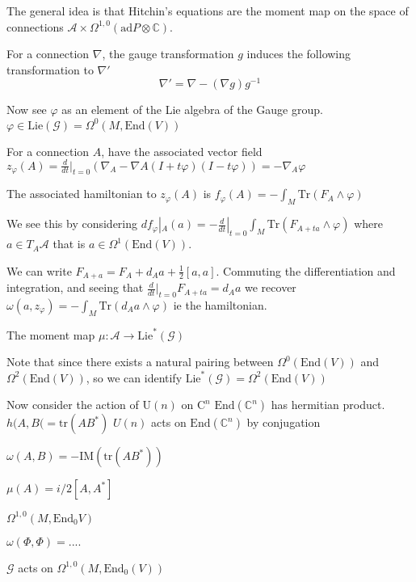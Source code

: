 The general idea is that Hitchin's equations are the moment map on the space of connections $\mathcal{A} \times \Omega^{1,0} ( \mathrm{ad}P \otimes \mathbb{C} ) $. 

For a connection $\nabla$, the gauge transformation $g$ induces the following transformation to $\nabla'$
\begin{equation}
    \nabla' = \nabla  - ( \nabla  g ) g^{-1} 
\end{equation}

Now see $ \varphi $ as an element of the Lie algebra of the Gauge group. 
$ \varphi \in \mathrm{Lie} ( \mathcal{G} ) = \Omega^0 (M, \mathrm{End} ( V)) $

For a connection $A$, have the associated vector field
$ z_\varphi ( A) = \frac{d}{dt} |_{t=0 } ( \nabla_A - \nabla{A} ( I + t \varphi ) ( I -t \varphi) ) = - \nabla_A \varphi $

The associated hamiltonian to $z_\varphi ( A)$ is  
$ f_\varphi (A) = - \int_M \mathrm{Tr} (F_A \wedge \varphi ) $

We see this by considering
$ d f_\varphi |_A (a) = - \frac{d}{dt} |_{t=0} \int_M \mathrm{Tr} ( F_{A+t a} \wedge \varphi) $
where $a \in T_A \mathcal{A} $ that is $ a \in \Omega^1(\mathrm{End}(V) ) $.  

We can write
$F_{A+a } = F_A + d_A a + \frac{1}{2} [a,a ]$. 
Commuting the differentiation and integration, 
and seeing that $ \frac{d}{dt}|_{t=0} F_{A+ta} = d_A a  $
we recover $ \omega ( a , z_\varphi) =  - \int_M \mathrm{Tr} (d_A a \wedge \varphi)  $ ie the hamiltonian. 

The moment map
$\mu : \mathcal{A} \rightarrow  \mathrm{Lie}^* ( \mathcal{G} )$ 

Note that since there exists a natural pairing between $ \Omega ^0 ( \mathrm{End}(V))$ and $ \Omega ^2 ( \mathrm{End}(V)) $, so we can identify 
$ \mathrm{Lie}^*(\mathcal{G}) = \Omega ^2 ( \mathrm{End}(V))$ 


Now consider the action of $\mathrm{U} ( n) $ on $\mathrm{C} ^n $ 
$ \mathrm{End} (\mathbb{C} ^n) $ has hermitian product.
$h(A,B( = \mathrm{tr} ( AB^*) $
$U(n) $ acts on $ \mathrm{End} ( \mathbb{C} ^n) $ by conjugation 

$\omega(A,B) = - \mathrm{IM}(\mathrm{tr}( AB^*)) $

$ \mu (A) = i/2 [ A, A^*] $ 

$ \Omega^{1,0} ( M, \mathrm{End}_0 V ) $

$\omega(\Phi, \Phi )  = .... $ 

$\mathcal{G} $ acts on $ \Omega^{1,0}( M, \mathrm{End} _0 (V) ) $

